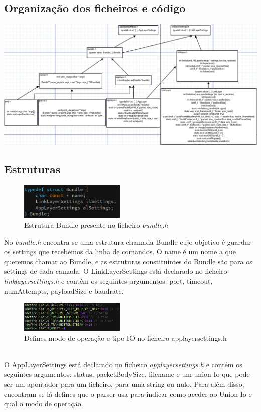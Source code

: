 \documentclass[a4paper]{article}
\begin{document}
\subsection{Organização dos ficheiros e código}
\centerline{\includegraphics[scale=0.70]{organizacaoFicheirosECodigo.png}}

\subsection{Estruturas}
\begin{figure}[h]
    \centering
    \includegraphics[width=0.45\textwidth]{bundleStruct.png}
    \caption{Estrutura Bundle presente no ficheiro \textit{bundle.h}}
\end{figure}
No \textit{bundle.h} encontra-se uma estrutura chamada Bundle cujo objetivo é
guardar os settings que recebemos da linha de comandos. O name é um nome a que
queremos chamar ao Bundle, e as estruturas constituintes do Bundle são para os
settings de cada camada. O LinkLayerSettings está declarado no ficheiro
\textit{linklayersettings.h} e contém os seguintes argumentos: port, timeout,
numAttempts, payloadSize e baudrate.
\begin{figure}[h]
\centering
    \includegraphics[width=0.45\textwidth]{status.png}
    \caption{Defines modo de operação e tipo IO no ficheiro
    applayersettings.h}
\end{figure}\\
O AppLayerSettings está declarado no
ficheiro \textit{applayersettings.h} e contém os seguintes argumentos: status,
packetBodySize, filename e um union Io que pode ser um apontador para um
ficheiro, para uma string ou nulo. Para além disso, encontram-se lá defines que
o parser usa para indicar como aceder ao Union Io e qual o modo de
operação.\\\newline
\end{document}
